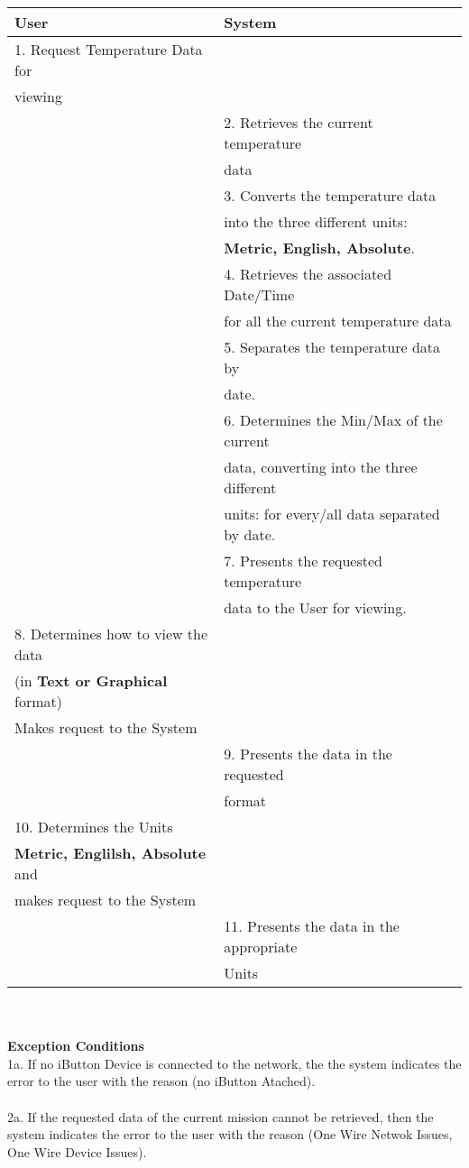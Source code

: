 \documentclass[letterpaper]{article}
\begin{document}
\begin{tabular}{|l|l|}\hline
\textbf{User} & \textbf{System}\\\hline
1.  Request Temperature Data for &\\
viewing & \\\hline
& 2.  Retrieves the current temperature\\
& data\\\hline
& 3.  Converts the temperature data\\
& into the three different units: \\
& \textbf{Metric, English, Absolute}.\\\hline
& 4.  Retrieves the associated Date/Time\\
& for all the current temperature data\\\hline
& 5.  Separates the temperature data by\\
& date.\\\hline
& 6.  Determines the Min/Max of the current\\
& data, converting into the three different\\
& units:  for every/all data separated by date.\\\hline
& 7.  Presents the requested temperature\\
& data to the User for viewing.\\\hline
8. Determines how to view the data & \\
(in \textbf{Text or Graphical} format) & \\
Makes request to the System &\\\hline
& 9.  Presents the data in the requested\\
& format\\\hline
10.  Determines the Units & \\
\textbf{Metric, Englilsh, Absolute} and & \\
makes request to the System &\\\hline
& 11.  Presents the data in the appropriate\\
& Units\\\hline
\end{tabular}\\\\
\textbf{Exception Conditions}\\
1a.  If no iButton Device is connected to the network, the the system
indicates the error to the user with the reason (no iButton Atached).\\\\
2a.  If the requested data of the current mission cannot be retrieved,
then the system indicates the error to the user with the reason (One
Wire Netwok Issues, One Wire Device Issues).
\end{document}
